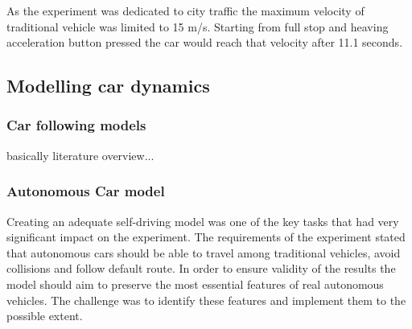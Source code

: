\documentclass[11pt,english]{article}
\begin{document}
As the experiment was dedicated to city traffic the maximum velocity of traditional vehicle was limited to 15 m/s. Starting from full stop and heaving acceleration button pressed the car would reach that velocity after 11.1 seconds.






















\subsection{Modelling car dynamics}


\subsubsection{Car following models}

basically literature overview...


\subsubsection{Autonomous Car model}


Creating an adequate self-driving model was one of the key tasks that had very significant impact on the experiment. The requirements of the experiment stated that autonomous cars should be able to travel among traditional vehicles, avoid collisions and follow default route. In order to ensure validity of the results the model should aim to preserve the most essential features of real autonomous vehicles. The challenge was to identify these features and implement them to the possible extent. 
\end{document}
